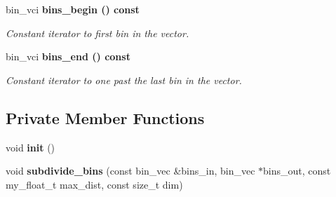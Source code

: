 \begin{CompactItemize}
\item 
bin\_\-vci \bf{bins\_\-begin} () const \label{classASCbase_1_1geometry_1_1FaceBins_03cd049c988e3cecd9d0fa8a9a035043}

\begin{CompactList}\small\item\em Constant iterator to first bin in the vector. \item\end{CompactList}\item 
bin\_\-vci \bf{bins\_\-end} () const \label{classASCbase_1_1geometry_1_1FaceBins_1e5f80ab1a6e5cf04415c80b8c8e6cc5}

\begin{CompactList}\small\item\em Constant iterator to one past the last bin in the vector. \item\end{CompactList}\end{CompactItemize}
\subsection*{Private Member Functions}
\begin{CompactItemize}
\item 
void \textbf{init} ()\label{classASCbase_1_1geometry_1_1FaceBins_f81405e328ea773342dc75e8a343ee6b}

\item 
void \textbf{subdivide\_\-bins} (const bin\_\-vec \&bins\_\-in, bin\_\-vec $\ast$bins\_\-out, const my\_\-float\_\-t max\_\-dist, const size\_\-t dim)\label{classASCbase_1_1geometry_1_1FaceBins_d2ef0a7082f69f208e9fc3a7f28dd4c3}

\end{CompactItemize}
